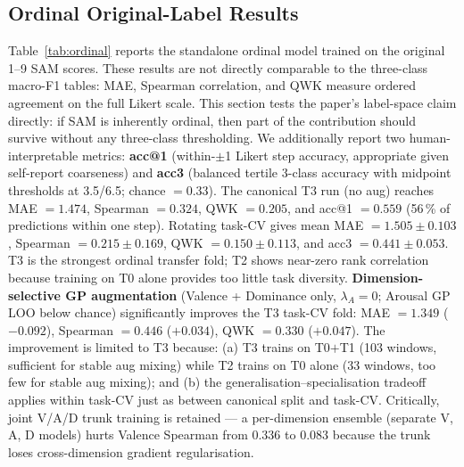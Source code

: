 \documentclass[sigconf,nonacm]{acmart}
\begin{document}
\subsection{Ordinal Original-Label Results}
\label{sec:ordinal_results}

Table~\ref{tab:ordinal} reports the standalone ordinal model trained on the
original 1--9 SAM scores.  These results are not directly comparable to the
three-class macro-F1 tables: MAE, Spearman correlation, and QWK measure ordered
agreement on the full Likert scale.
This section tests the paper's label-space claim directly:
if SAM is inherently ordinal, then part of the contribution should survive
without any three-class thresholding.
We additionally report two human-interpretable metrics:
\textbf{acc@1} (within-$\pm$1 Likert step accuracy, appropriate given
self-report coarseness) and \textbf{acc3} (balanced tertile 3-class accuracy
with midpoint thresholds at 3.5/6.5; chance $= 0.33$).
The canonical T3 run (no aug) reaches MAE $=1.474$, Spearman $=0.324$, QWK $=0.205$,
and acc@1 $=0.559$ (56\,\% of predictions within one step).
Rotating task-CV gives mean MAE $=1.505 \pm 0.103$, Spearman $=0.215 \pm 0.169$,
QWK $=0.150 \pm 0.113$, and acc3 $=0.441 \pm 0.053$.
T3 is the strongest ordinal transfer fold; T2 shows near-zero rank correlation
because training on T0 alone provides too little task diversity.
\textbf{Dimension-selective GP augmentation} (Valence + Dominance only,
$\lambda_A{=}0$; Arousal GP LOO below chance) significantly improves the T3 task-CV fold:
MAE $=1.349$ ($-0.092$), Spearman $=0.446$ ($+0.034$), QWK $=0.330$ ($+0.047$).
The improvement is limited to T3 because: (a) T3 trains on T0$+$T1 (103 windows,
sufficient for stable aug mixing) while T2 trains on T0 alone (33 windows,
too few for stable aug mixing); and (b) the generalisation--specialisation tradeoff
applies within task-CV just as between canonical split and task-CV.
Critically, joint V/A/D trunk training is retained --- a per-dimension ensemble
(separate V, A, D models) hurts Valence Spearman from $0.336$ to $0.083$
because the trunk loses cross-dimension gradient regularisation.
\end{document}
